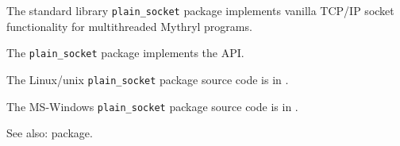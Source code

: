 
The standard library {\tt plain\_socket} package implements vanilla {\sc TCP/IP} socket functionality for multithreaded Mythryl programs.

The {\tt plain\_socket} package implements the  API.

The Linux/unix {\tt plain\_socket} package source code is in .

The {\sc MS-Windows} {\tt plain\_socket} package source code is in .

See also:  package.

